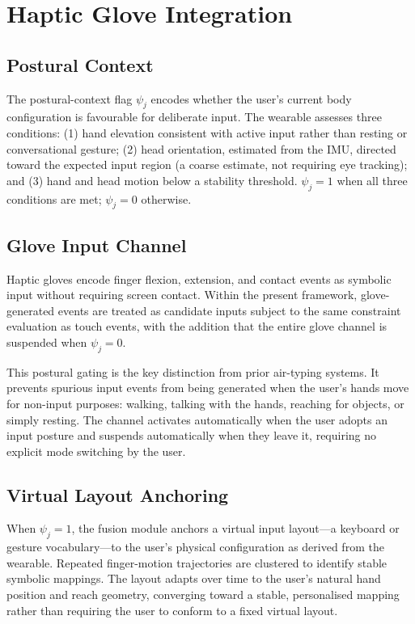 \documentclass[11pt,letterpaper]{article}
\begin{document}
\section{Haptic Glove Integration}
\label{sec:haptic}

\subsection{Postural Context}

The postural-context flag $\psi_j$ encodes whether the user's current body
configuration is favourable for deliberate input. The wearable assesses three
conditions: (1) hand elevation consistent with active input rather than resting
or conversational gesture; (2) head orientation, estimated from the IMU, directed
toward the expected input region (a coarse estimate, not requiring eye tracking);
and (3) hand and head motion below a stability threshold. $\psi_j = 1$ when all
three conditions are met; $\psi_j = 0$ otherwise.

\subsection{Glove Input Channel}

Haptic gloves encode finger flexion, extension, and contact events as symbolic
input without requiring screen contact. Within the present framework, glove-generated
events are treated as candidate inputs subject to the same constraint evaluation
as touch events, with the addition that the entire glove channel is suspended when
$\psi_j = 0$.

This postural gating is the key distinction from prior air-typing systems. It
prevents spurious input events from being generated when the user's hands move for
non-input purposes: walking, talking with the hands, reaching for objects, or simply
resting. The channel activates automatically when the user adopts an input posture
and suspends automatically when they leave it, requiring no explicit mode switching
by the user.

\subsection{Virtual Layout Anchoring}

When $\psi_j = 1$, the fusion module anchors a virtual input layout---a keyboard
or gesture vocabulary---to the user's physical configuration as derived from the
wearable. Repeated finger-motion trajectories are clustered to identify stable
symbolic mappings. The layout adapts over time to the user's natural hand position
and reach geometry, converging toward a stable, personalised mapping rather than
requiring the user to conform to a fixed virtual layout.
\end{document}
